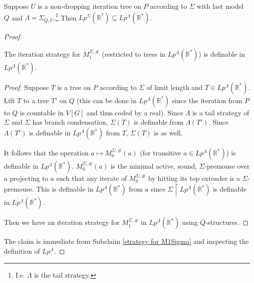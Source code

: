 \documentclass[10pt,a4paper]{amsart}
\newcommand\R{\mathbb{R}}
\begin{document}
    \begin{claim}
    \label{getting sigma from lambda}
        Suppose $U$ is a non-dropping iteration tree on $P$ according to $\Sigma$ with last model $Q$ and $\Lambda = \Sigma_{Q,U}$.\footnote{I.e. $\Lambda$ is the tail strategy.} Then $Lp^{\Sigma}(\R^*) \subseteq Lp^{\Lambda}(\R^*)$.
    \end{claim}

    \begin{proof}
        \begin{subclaim}
        \label{strategy for M1Sigma}
            The iteration strategy for $M_1^{\Sigma,\#}$ (restricted to trees in $Lp^{\Lambda}(\R^*)$) is definable in $Lp^{\Lambda}(\R^*)$.
        \end{subclaim}
        \begin{proof}
            Suppose $T$ is a tree on $P$ according to $\Sigma$ of limit length and $T\in Lp^{\Lambda}(\R^*)$. Lift $T$ to a tree $T'$ on $Q$ (this can be done in $Lp^{\Lambda}(\R^*)$ since the iteration from $P$ to $Q$ is countable in $V[G]$ and thus coded by a real). Since $\Lambda$ is a tail strategy of $\Sigma$ and $\Sigma$ has branch condensation, $\Sigma(T)$ is definable from $\Lambda(T')$. Since $\Lambda(T')$ is definable in $Lp^{\Lambda}(\R^*)$ from $T$, $\Sigma(T)$ is as well.

            It follows that the operation $a \mapsto M_0^{\Sigma,\#}(a)$ (for transitive $a\in Lp^{\Lambda}(\R^*)$) is definable in $Lp^{\Lambda}(\R^*)$. $M_0^{\Sigma,\#}(a)$ is the minimal active, sound, $\Sigma$-premouse over $a$ projecting to $a$ such that any iterate of $M_0^{\Sigma,\#}$ by hitting its top extender is a $\Sigma$-premouse. This is definable in $Lp^{\Lambda}(\R^*)$ from $a$ since $\Sigma\upharpoonright Lp^{\Lambda}(\R^*)$ is definable in $Lp^{\Lambda}(\R^*)$.

            Then we have an iteration strategy for $M_1^{\Sigma,\#}$ in $Lp^{\Lambda}(\R^*)$ using $Q$-structures.
        \end{proof}

        The claim is immediate from Subclaim \ref{strategy for M1Sigma} and inspecting the definition of $Lp^{\Lambda}$.
    \end{proof}
\end{document}
